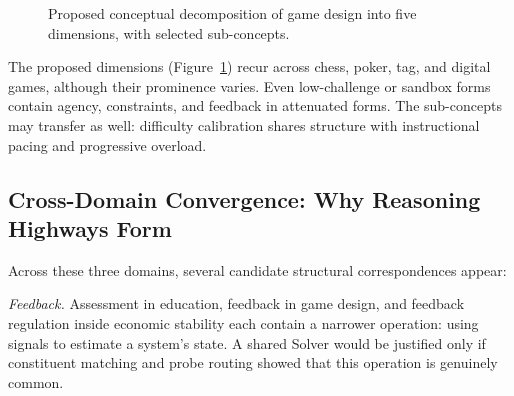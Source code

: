 \documentclass[11pt]{article}
\begin{document}
\begin{figure}[H]
\centering
{}
\caption{Proposed conceptual decomposition of game design into five dimensions, with selected sub-concepts.}
\label{fig:game-tree}
\end{figure}

The proposed dimensions (Figure~\ref{fig:game-tree}) recur across chess, poker, tag, and digital games, although their prominence varies. Even low-challenge or sandbox forms contain agency, constraints, and feedback in attenuated forms. The sub-concepts may transfer as well: difficulty calibration shares structure with instructional pacing and progressive overload.

\subsection{Cross-Domain Convergence: Why Reasoning Highways Form}
\label{sec:highway-selection}

Across these three domains, several candidate structural correspondences appear:

\emph{Feedback.} Assessment in education, feedback in game design, and feedback regulation inside economic stability each contain a narrower operation: using signals to estimate a system's state. A shared Solver would be justified only if constituent matching and probe routing showed that this operation is genuinely common.
\end{document}
